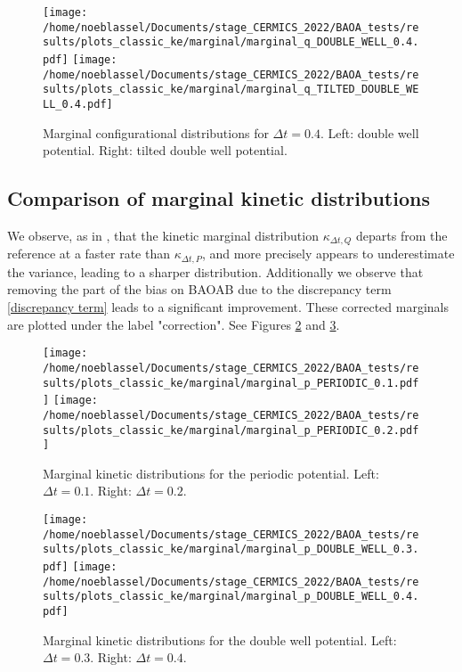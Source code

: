 \begin{figure}[htbp]
  \begin{center}
    \texttt{[image: /home/noeblassel/Documents/stage\_CERMICS\_2022/BAOA\_tests/results/plots\_classic\_ke/marginal/marginal\_q\_DOUBLE\_WELL\_0.4.pdf]}
    \texttt{[image: /home/noeblassel/Documents/stage\_CERMICS\_2022/BAOA\_tests/results/plots\_classic\_ke/marginal/marginal\_q\_TILTED\_DOUBLE\_WELL\_0.4.pdf]}
    
    \caption{ \label{fig:marginal_q_wells}
      Marginal configurational distributions for $\Delta t=0.4$. Left: double well potential. Right: tilted double well potential.
    }
  \end{center}
\end{figure}


\subsection{Comparison of marginal kinetic distributions}\label{kappaP neq kappaQ}
We observe, as in \cite{KK22}, that the kinetic marginal distribution $\kappa_{\Delta t,Q}$ departs from the reference at a faster rate than $\kappa_{\Delta t,P}$, and more precisely appears to underestimate the variance, leading to a sharper distribution.
Additionally we observe that removing the part of the bias on BAOAB due to the discrepancy term \eqref{discrepancy term} leads to a significant improvement. These corrected marginals are plotted under the label "correction".
See Figures \ref{fig:marginal_p_periodic} and \ref{fig:marginal_p_double_well}.

\begin{figure}[htbp]
  \begin{center}
    \texttt{[image: /home/noeblassel/Documents/stage\_CERMICS\_2022/BAOA\_tests/results/plots\_classic\_ke/marginal/marginal\_p\_PERIODIC\_0.1.pdf]}
    \texttt{[image: /home/noeblassel/Documents/stage\_CERMICS\_2022/BAOA\_tests/results/plots\_classic\_ke/marginal/marginal\_p\_PERIODIC\_0.2.pdf]}
    
    \caption{ \label{fig:marginal_p_periodic}
      Marginal kinetic distributions for the periodic potential. Left: $\Delta t=0.1$. Right: $\Delta t=0.2$.
    }
  \end{center}
\end{figure}

\begin{figure}[htbp]
  \begin{center}
    \texttt{[image: /home/noeblassel/Documents/stage\_CERMICS\_2022/BAOA\_tests/results/plots\_classic\_ke/marginal/marginal\_p\_DOUBLE\_WELL\_0.3.pdf]}
    \texttt{[image: /home/noeblassel/Documents/stage\_CERMICS\_2022/BAOA\_tests/results/plots\_classic\_ke/marginal/marginal\_p\_DOUBLE\_WELL\_0.4.pdf]}
    
    \caption{ \label{fig:marginal_p_double_well}
      Marginal kinetic distributions for the double well potential. Left: $\Delta t=0.3$. Right: $\Delta t=0.4$.
    }
  \end{center}
\end{figure}


